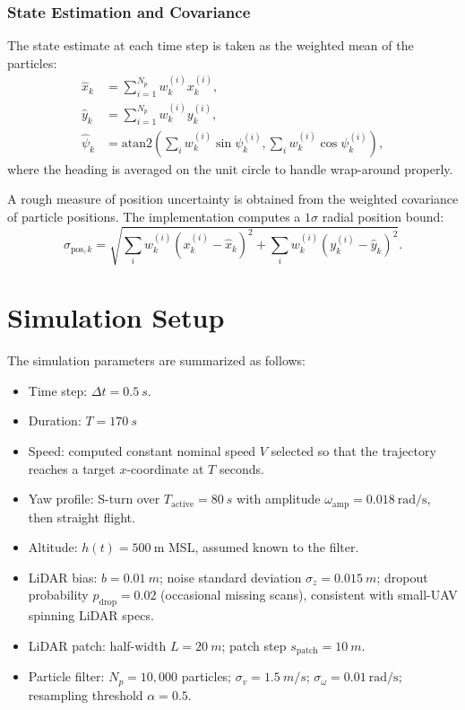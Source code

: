\documentclass[conference]{IEEEtran}
\begin{document}
\subsubsection{State Estimation and Covariance}
The state estimate at each time step is taken as the weighted mean of the particles:
\begin{align}
  \hat{x}_k &= \sum_{i=1}^{N_p} w_k^{(i)} x_k^{(i)}, \\
  \hat{y}_k &= \sum_{i=1}^{N_p} w_k^{(i)} y_k^{(i)}, \\
  \hat{\psi}_k &= \text{atan2}\left(
      \sum_{i} w_k^{(i)} \sin \psi_k^{(i)},
      \sum_{i} w_k^{(i)} \cos \psi_k^{(i)}
  \right),
\end{align}
where the heading is averaged on the unit circle to handle wrap-around properly.

A rough measure of position uncertainty is obtained from the weighted covariance of particle positions. The implementation computes a $1\sigma$ radial position bound:
\begin{equation}
  \sigma_{\text{pos},k} = \sqrt{
    \sum_i w_k^{(i)} (x_k^{(i)} - \hat{x}_k)^2 +
    \sum_i w_k^{(i)} (y_k^{(i)} - \hat{y}_k)^2
  }.
\end{equation}

\section{Simulation Setup}
The simulation parameters are summarized as follows:
\begin{itemize}
  \item Time step: $\Delta t = \SI{0.5}{s}$.
  \item Duration: $T = \SI{170}{s}$
  \item Speed: computed constant nominal speed $V$ selected so that the trajectory reaches a target $x$-coordinate at $T$ seconds.
  \item Yaw profile: S-turn over $T_{\text{active}} = \SI{80}{s}$ with amplitude $\omega_{\text{amp}}=0.018~\text{rad/s}$, then straight flight.
  \item Altitude: $h(t) = 500 ~\text{m}$ MSL, assumed known to the filter.
  \item LiDAR bias: $b = \SI{0.01}{m}$; noise standard deviation $\sigma_z = \SI{0.015}{m}$; dropout probability $p_{\text{drop}} = 0.02$ (occasional missing scans), consistent with small-UAV spinning LiDAR specs.\cite{velodyne_puck_datasheet}
  \item LiDAR patch: half-width $L = \SI{20}{m}$; patch step $s_{\text{patch}} = \SI{10}{m}$.
  \item Particle filter: $N_p = 10{,}000$ particles; $\sigma_v = \SI{1.5}{m/s}$; $\sigma_\omega = 0.01~\text{rad/s}$; resampling threshold $\alpha=0.5$.
\end{itemize}
\end{document}

